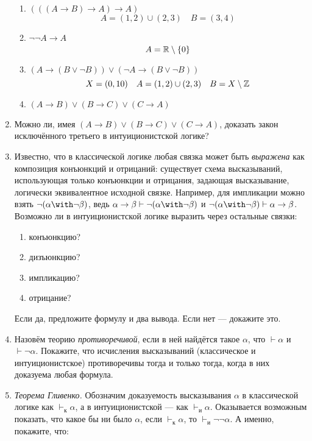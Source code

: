 \begin{enumerate}
\begin{enumerate}
              \item $(((A \rightarrow B) \rightarrow A) \rightarrow A)$
                    \[A = (1, 2) \cup (2, 3) \quad B = (3, 4)\]
              \item $\neg\neg A \rightarrow A$
                    \[A = \mathbb{R}\setminus \{0\} \]
              \item $(A \rightarrow (B \vee \neg B)) \vee (\neg A \rightarrow (B \vee \neg B))$
                    \[X = (0, 10) \quad A = (1, 2) \cup (2, 3) \quad B = X\setminus \mathbb{Z}\]
              \item $(A \rightarrow B) \vee (B \rightarrow C) \vee (C \rightarrow A)$
          \end{enumerate}

    \item Можно ли, имея $(A \rightarrow B) \vee (B \rightarrow C) \vee (C \rightarrow A)$, доказать
          закон исключённого третьего в интуиционистской логике?

    \item Известно, что в классической логике любая связка может быть \emph{выражена} как композиция
          конъюнкций и отрицаний: существует схема высказываний, использующая только конъюнкции и отрицания,
          задающая высказывание, логически эквивалентное исходной связке.
          Например, для импликации можно взять $\neg(\alpha\with\neg\beta)$, ведь
          $\alpha\rightarrow\beta\vdash\neg(\alpha\with\neg\beta)$ и $\neg(\alpha\with\neg\beta)\vdash\alpha\rightarrow\beta$.
          Возможно ли в интуиционистской логике выразить через остальные связки:
          \begin{enumerate}
              \item конъюнкцию?
              \item дизъюнкцию?
              \item импликацию?
              \item отрицание?
          \end{enumerate}
          Если да, предложите формулу и два вывода. Если нет --- докажите это.

    \item Назовём теорию \emph{противоречивой}, если в ней найдётся такое $\alpha$, что $\vdash\alpha$ и $\vdash\neg\alpha$.
          Покажите, что исчисления высказываний (классическое и интуиционистское) противоречивы тогда и только тогда,
          когда в них доказуема любая формула.

    \item \emph{Теорема Гливенко.} Обозначим доказуемость высказывания $\alpha$ в классической логике
          как $\vdash_\text{к}\alpha$, а в интуиционистской --- как $\vdash_\text{и}\alpha$.
          Оказывается возможным показать, что какое бы ни было $\alpha$, если $\vdash_\text{к}\alpha$,
          то $\vdash_\text{и}\neg\neg\alpha$. А именно, покажите, что:


\end{enumerate}
